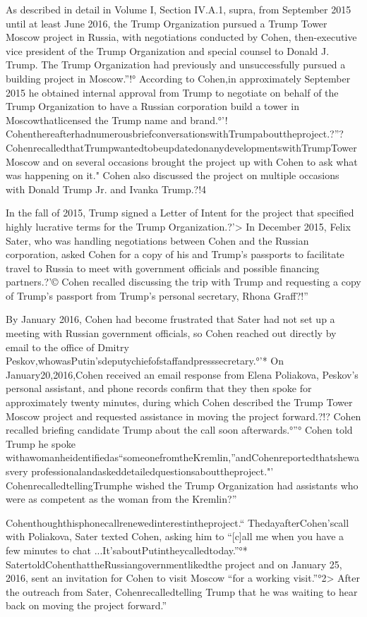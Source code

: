 As described in detail in Volume I, Section IV.A.1, supra, from September 2015 until at least June 2016, the Trump Organization pursued a Trump Tower Moscow project in Russia, with negotiations conducted by Cohen, then-executive vice president of the Trump Organization and special counsel to Donald J. Trump.%
The Trump Organization had previously and unsuccessfully pursued a building project in Moscow.”!° According to Cohen,in approximately September 2015 he obtained internal approval from Trump to negotiate on behalf of the Trump Organization to have a Russian corporation build a tower in Moscowthatlicensed the Trump name and brand.°'! CohenthereafterhadnumerousbriefconversationswithTrumpabouttheproject.?”? CohenrecalledthatTrumpwantedtobeupdatedonanydevelopmentswithTrumpTowerMoscow and on several occasions brought the project up with Cohen to ask what was happening on it." Cohen also discussed the project on multiple occasions with Donald Trump Jr. and Ivanka Trump.?!4

In the fall of 2015, Trump signed a Letter of Intent for the project that specified highly lucrative terms for the Trump Organization.?'> In December 2015, Felix Sater, who was handling negotiations between Cohen and the Russian corporation, asked Cohen for a copy of his and Trump's passports to facilitate travel to Russia to meet with government officials and possible financing partners.?'© Cohen recalled discussing the trip with Trump and requesting a copy of Trump's passport from Trump's personal secretary, Rhona Graff?!”

By January 2016, Cohen had become frustrated that Sater had not set up a meeting with Russian government officials, so Cohen reached out directly by email to the office of Dmitry Peskov,whowasPutin'sdeputychiefofstaffandpresssecretary.°'* On January20,2016,Cohen received an email response from Elena Poliakova, Peskov's personal assistant, and phone records confirm that they then spoke for approximately twenty minutes, during which Cohen described the Trump Tower Moscow project and requested assistance in moving the project forward.?!? Cohen recalled briefing candidate Trump about the call soon afterwards.°”° Cohen told Trump he spoke withawomanheidentifiedas“someonefromtheKremlin,”andCohenreportedthatshewasvery professionalandaskeddetailedquestionsabouttheproject."' CohenrecalledtellingTrumphe wished the Trump Organization had assistants who were as competent as the woman from the Kremlin?”

Cohenthoughthisphonecallrenewedinterestintheproject.“ ThedayafterCohen'scall with Poliakova, Sater texted Cohen, asking him to “[c]all me when you have a few minutes to chat ...It'saboutPutintheycalledtoday.”°* SatertoldCohenthattheRussiangovernmentlikedthe project and on January 25, 2016, sent an invitation for Cohen to visit Moscow “for a working visit.”°2> After the outreach from Sater, Cohenrecalledtelling Trump that he was waiting to hear back on moving the project forward.”

